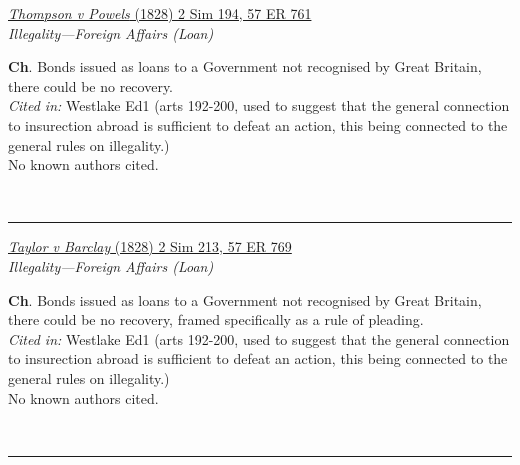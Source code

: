 \documentclass[twoside]{article}
\begin{document}
        \begin{small}
        \begin{center}
        \href{https://heinonline.org/HOL/P?h=hein.engrep/engre0057&i=769}{\textit{Thompson v Powels} (1828) 2 Sim 194, 57 ER 761} \label{73} \\ 
\textit{Illegality---Foreign Affairs (Loan)}\\
        \end{center}
        \textbf{Ch}. Bonds issued as loans to a Government not recognised by Great Britain, there could be no recovery.\\\textit{Cited in: }Westlake Ed1 (arts 192-200, used to suggest that the general connection to insurection abroad is sufficient to defeat an action, this being connected to the general rules on illegality.)\\No known authors cited.
        \end{small}\\
        \rule{\textwidth}{0.5pt}
        

        \begin{small}
        \begin{center}
        \href{https://heinonline.org/HOL/P?h=hein.engrep/engre0057&i=777}{\textit{Taylor v Barclay} (1828) 2 Sim 213, 57 ER 769} \label{74} \\ 
\textit{Illegality---Foreign Affairs (Loan)}\\
        \end{center}
        \textbf{Ch}. Bonds issued as loans to a Government not recognised by Great Britain, there could be no recovery, framed specifically as a rule of pleading.\\\textit{Cited in: }Westlake Ed1 (arts 192-200, used to suggest that the general connection to insurection abroad is sufficient to defeat an action, this being connected to the general rules on illegality.)\\No known authors cited.
        \end{small}\\
        \rule{\textwidth}{0.5pt}
        
\end{document}
